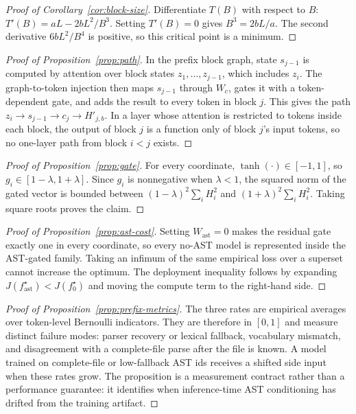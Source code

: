 \documentclass[10pt]{article}
\begin{document}
\begin{proof}[Proof of Corollary~\ref{cor:block-size}]
Differentiate $T(B)$ with respect to $B$:
$T'(B)=aL-2bL^2/B^3$.  Setting $T'(B)=0$ gives
$B^3=2bL/a$.  The second derivative $6bL^2/B^4$ is positive, so this critical
point is a minimum.
\end{proof}

\begin{proof}[Proof of Proposition~\ref{prop:path}]
In the prefix block graph, state $s_{j-1}$ is computed by attention over block
states $z_1,\ldots,z_{j-1}$, which includes $z_i$.  The graph-to-token injection
then maps $s_{j-1}$ through $W_c$, gates it with a token-dependent gate, and adds
the result to every token in block $j$.  This gives the path
$z_i\rightarrow s_{j-1}\rightarrow c_j\rightarrow H'_{j,b}$.  In a layer whose
attention is restricted to tokens inside each block, the output of block $j$ is
a function only of block $j$'s input tokens, so no one-layer path from block
$i<j$ exists.
\end{proof}

\begin{proof}[Proof of Proposition~\ref{prop:gate}]
For every coordinate, $\tanh(\cdot)\in[-1,1]$, so
$g_i\in[1-\lambda,1+\lambda]$.  Since $g_i$ is nonnegative when
$\lambda<1$, the squared norm of the gated vector is bounded between
$(1-\lambda)^2\sum_i H_i^2$ and $(1+\lambda)^2\sum_i H_i^2$.  Taking square
roots proves the claim.
\end{proof}

\begin{proof}[Proof of Proposition~\ref{prop:ast-cost}]
Setting $W_{\mathrm{ast}}=0$ makes the residual gate exactly one in every
coordinate, so every no-AST model is represented inside the AST-gated family.
Taking an infimum of the same empirical loss over a superset cannot increase
the optimum.  The deployment inequality follows by expanding
$J(f_{\mathrm{ast}}^\star)<J(f_0^\star)$ and moving the compute term to the
right-hand side.
\end{proof}

\begin{proof}[Proof of Proposition~\ref{prop:prefix-metrics}]
The three rates are empirical averages over token-level Bernoulli indicators.
They are therefore in $[0,1]$ and measure distinct failure modes: parser
recovery or lexical fallback, vocabulary mismatch, and disagreement with a
complete-file parse after the file is known.  A model trained on complete-file
or low-fallback AST ids receives a shifted side input when these rates grow.
The proposition is a measurement contract rather than a performance guarantee:
it identifies when inference-time AST conditioning has drifted from the training
artifact.
\end{proof}
\end{document}
